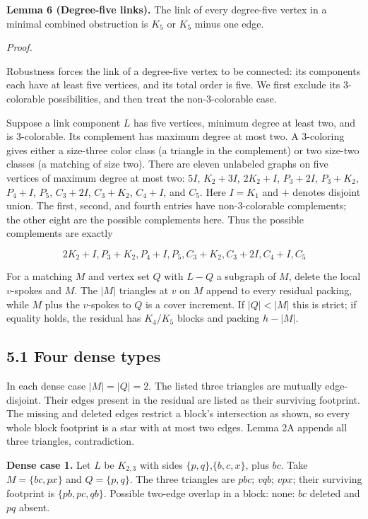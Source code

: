 \documentclass[11pt]{article}
\begin{document}
\textbf{Lemma 6 (Degree-five links).} The link of every degree-five
vertex in a minimal combined obstruction is \(K_5\) or \(K_5\) minus one
edge.

\emph{Proof.}

Robustness forces the link of a degree-five vertex to be connected: its
components each have at least five vertices, and its total order is
five. We first exclude its 3-colorable possibilities, and then treat the
non-3-colorable case.

Suppose a link component \(L\) has five vertices, minimum degree at
least two, and is 3-colorable. Its complement has maximum degree at most
two. A 3-coloring gives either a size-three color class (a triangle in
the complement) or two size-two classes (a matching of size two). There
are eleven unlabeled graphs on five vertices of maximum degree at most
two: \(5I\), \(K_2+3I\), \(2K_2+I\), \(P_3+2I\), \(P_3+K_2\), \(P_4+I\),
\(P_5\), \(C_3+2I\), \(C_3+K_2\), \(C_4+I\), and \(C_5\). Here \(I=K_1\)
and \(+\) denotes disjoint union. The first, second, and fourth entries
have non-3-colorable complements; the other eight are the possible
complements here. Thus the possible complements are exactly

\[2K_2+I, P_3+K_2, P_4+I, P_5, C_3+K_2, C_3+2I, C_4+I, C_5\]

For a matching \(M\) and vertex set \(Q\) with \(L-Q\) a subgraph of
\(M\), delete the local \(v\)-spokes and \(M\). The \(|M|\) triangles at
\(v\) on \(M\) append to every residual packing, while \(M\) plus the
\(v\)-spokes to \(Q\) is a cover increment. If \(|Q|<|M|\) this is
strict; if equality holds, the residual has \(K_4\)/\(K_5\) blocks and
packing \(h-|M|\).

\subsection{5.1 Four dense types}\label{four-dense-types}

In each dense case \(|M|=|Q|=2\). The listed three triangles are
mutually edge-disjoint. Their edges present in the residual are listed
as their surviving footprint. The missing and deleted edges restrict a
block's intersection as shown, so every whole block footprint is a star
with at most two edges. Lemma 2A appends all three triangles,
contradiction.

\textbf{Dense case 1.} Let \(L\) be \(K_{2,3}\) with sides
\(\{p,q\}\),\(\{b,c,x\}\), plus \(bc\). Take \(M=\{bc,px\}\) and
\(Q=\{p,q\}\). The three triangles are \(pbc\); \(vqb\); \(vpx\); their
surviving footprint is \(\{pb,pc,qb\}\). Possible two-edge overlap in a
block: none: \(bc\) deleted and \(pq\) absent.
\end{document}
